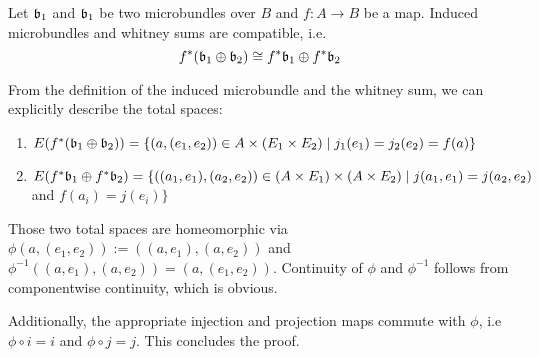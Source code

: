 \begin{mylemma}
    Let $\mathfrak{b}_1$ and $\mathfrak{b}_1$ be two microbundles over $B$ and $f: A \to B$ be a map.
    Induced microbundles and whitney sums are compatible, i.e.
    \[ f^*(\mathfrak{b}_1 \oplus \mathfrak{b}_2) \cong f^*\mathfrak{b}_1 \oplus f^*\mathfrak{b}_2 \]
\end{mylemma}
\begin{myproof}
    From the definition of the induced microbundle and the whitney sum, we can explicitly describe the total spaces:
    \begin{enumerate}
        \item $E(f^*(\mathfrak{b}_1 \oplus \mathfrak{b}_2)) = \{(a, (e_1, e_2)) \in A \times (E_1 \times E_2) \mid j_1(e_1) = j_2(e_2) = f(a) \}$
        \item $E(f^*\mathfrak{b}_1 \oplus f^*\mathfrak{b}_2) = \{((a_1, e_1), (a_2, e_2)) \in (A \times E_1) \times (A \times E_2) \mid j(a_1, e_1) = j(a_2, e_2)$ and $f(a_i) = j(e_i)\}$
    \end{enumerate}
    Those two total spaces are homeomorphic via $\phi(a, (e_1, e_2)) := ((a, e_1), (a, e_2))$ and
    $\phi^{-1}((a, e_1), (a, e_2)) = (a, (e_1, e_2))$. Continuity of $\phi$ and $\phi^{-1}$ follows from componentwise continuity, which is obvious.
    
    Additionally, the appropriate injection and projection maps commute with $\phi$, i.e $\phi \circ i = i$ and $\phi \circ j = j$.
    This concludes the proof. 
\end{myproof}